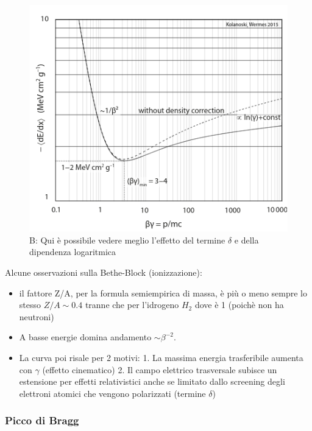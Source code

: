 \begin{minipage}{0.48\textwidth}

\begin{figure}[H]
    \centering
    \includegraphics[width=\textwidth,frame]{Chapters/images/Interazione_radiazione_materia/image-20220214175429234.png}
    \captionsetup{width=\textwidth}
    \caption{B: Qui è possibile vedere meglio l'effetto del termine $\delta$ e della dipendenza logaritmica}
    \label{fig:}
\end{figure}

\end{minipage}
Alcune osservazioni sulla Bethe-Block (ionizzazione):
\begin{itemize}
    \item il fattore Z/A, per la formula semiempirica di massa, è più o meno sempre lo stesso $Z/A\sim 0.4$ tranne che per l'idrogeno $H_2$ dove è 1 (poichè non ha neutroni)
    \item A basse energie domina andamento $\sim \beta^{-2}$.
    \item La curva poi risale per 2 motivi:
    1. La massima energia trasferibile aumenta con $ \gamma$ (effetto cinematico)
    2. Il campo elettrico trasversale subisce un estensione per effetti relativistici anche se limitato dallo screening degli elettroni atomici che vengono polarizzati (termine $\delta$)
\end{itemize}

\subsubsection*{Picco di Bragg}

